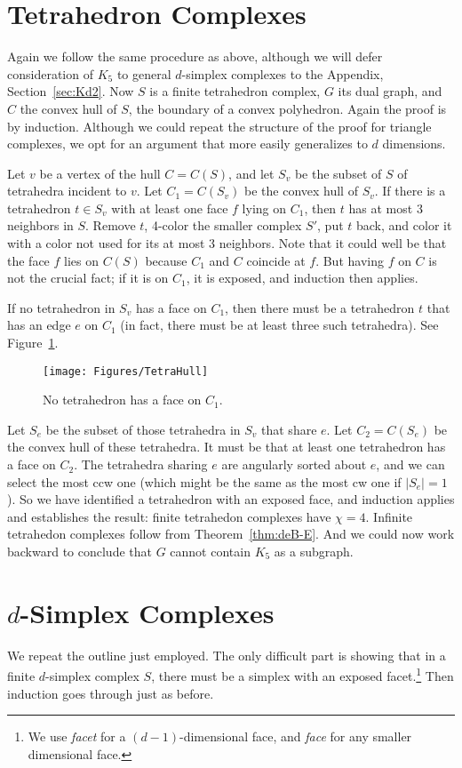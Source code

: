 \pdfoutput=1  \documentclass[]{article}
\newcommand{\figlab}[1]{\label{fig:#1}}
\newcommand{\thmref}[1]{\ref{thm:#1}}
\newcommand{\secref}[1]{\ref{sec:#1}}
\newcommand{\figref}[1]{\ref{fig:#1}}
\def\c{{\chi}}
\begin{document}
\section{Tetrahedron Complexes}
Again we follow the same procedure as above, although we will defer
consideration of $K_5$ to general $d$-simplex complexes to the
Appendix, Section~\secref{Kd2}.
Now $S$ is a finite tetrahedron complex, $G$ its dual graph, and $C$
the convex hull of $S$, the boundary of a convex polyhedron.
Again the proof is by induction.  Although we could repeat the
structure
of the proof for triangle complexes, we opt for an argument that more
easily
generalizes to $d$ dimensions.

Let $v$ be a vertex of the hull $C=C(S)$, and let $S_v$ be the subset of
$S$ of tetrahedra incident to $v$.
Let $C_1=C(S_v)$ be the convex hull of $S_v$.
If there is a tetrahedron $t \in S_v$ with at least one face $f$ lying
on $C_1$, then $t$ has at most 3 neighbors in $S$.  Remove $t$,
4-color the smaller complex $S'$, put $t$ back, and color it with a
color not used for its at most 3 neighbors.
Note that it could well be that the face $f$ lies on $C(S)$ because
$C_1$ and $C$ coincide at $f$.  But having $f$ on $C$ is not the
crucial fact; if it is on $C_1$, it is exposed, and induction then
applies.

If no tetrahedron in $S_v$ has a face on $C_1$, then there must be a
tetrahedron
$t$ that has an edge $e$ on $C_1$ 
(in fact, there must be at least three such tetrahedra).
See Figure~\figref{TetraHull}.
\begin{figure}[htbp]
\centering
\texttt{[image: Figures/TetraHull]}
\caption{No tetrahedron has a face on $C_1$.}
\figlab{TetraHull}
\end{figure}


Let $S_e$ be the subset of those tetrahedra in $S_v$ that share $e$.
Let $C_2=C(S_e)$ be the convex hull of these tetrahedra.
It must be that at least one tetrahedron has a face on $C_2$.
The tetrahedra sharing $e$ are angularly sorted about $e$, and we can
select
the most ccw one (which might be the same as the most cw one if
$|S_e|=1$).
So we have identified a tetrahedron with an exposed face, and
induction applies and establishes the result:
finite tetrahedon complexes have $\c=4$.
Infinite tetrahedon complexes follow from 
Theorem~\thmref{deB-E}.
And we could now work backward to conclude that $G$ cannot contain
$K_5$ as a subgraph.

\section{$d$-Simplex Complexes}
We repeat the outline just employed.
The only difficult part is showing that in a finite $d$-simplex
complex $S$, there must be a simplex with an exposed facet.\footnote{
   We use \emph{facet} for a $(d{-}1)$-dimensional face, and
   \emph{face} for any smaller dimensional face.
}
Then induction goes through just as before.
\end{document}
